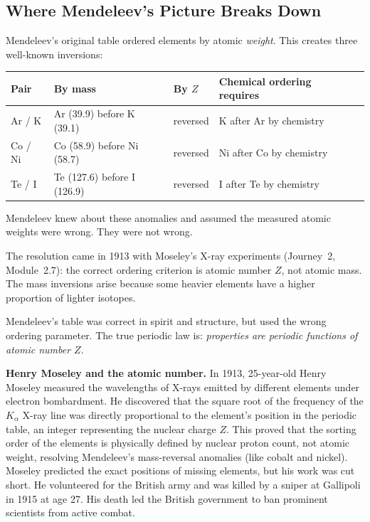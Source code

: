 \documentclass[12pt, a4paper]{book}
\begin{document}
\subsection*{Where Mendeleev's Picture Breaks Down}

\begin{modelbreaks}
Mendeleev's original table ordered elements by atomic \emph{weight}.
This creates three well-known inversions:

\begin{center}
\small
\begin{tabular}{lllll}
\toprule
Pair & By mass & By $Z$ & Chemical ordering requires \\
\midrule
Ar / K  & Ar (39.9) before K (39.1) & reversed & K after Ar by chemistry \\
Co / Ni & Co (58.9) before Ni (58.7) & reversed & Ni after Co by chemistry \\
Te / I  & Te (127.6) before I (126.9) & reversed & I after Te by chemistry \\
\bottomrule
\end{tabular}
\end{center}

Mendeleev knew about these anomalies and assumed the
measured atomic weights were wrong.
They were not wrong.

The resolution came in 1913 with Moseley's X-ray experiments
(Journey~2, Module~2.7): the correct ordering criterion
is atomic number $Z$, not atomic mass.
The mass inversions arise because some heavier elements
have a higher proportion of lighter isotopes.

Mendeleev's table was correct in spirit and structure,
but used the wrong ordering parameter.
The true periodic law is: \emph{properties are periodic
functions of atomic number $Z$}.
\end{modelbreaks}

\begin{historybox}
\textbf{Henry Moseley and the atomic number.}
In 1913, 25-year-old Henry Moseley measured the wavelengths of X-rays emitted by different elements under electron bombardment. He discovered that the square root of the frequency of the $K_\alpha$ X-ray line was directly proportional to the element's position in the periodic table, an integer representing the nuclear charge $Z$. This proved that the sorting order of the elements is physically defined by nuclear proton count, not atomic weight, resolving Mendeleev's mass-reversal anomalies (like cobalt and nickel). Moseley predicted the exact positions of missing elements, but his work was cut short. He volunteered for the British army and was killed by a sniper at Gallipoli in 1915 at age 27. His death led the British government to ban prominent scientists from active combat.
\end{historybox}
\end{document}
